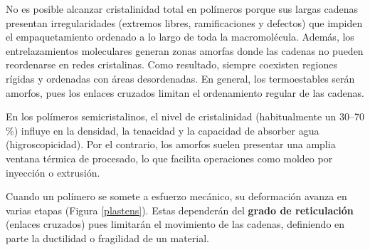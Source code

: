 No es posible alcanzar cristalinidad total en polímeros porque sus largas cadenas presentan irregularidades (extremos libres, ramificaciones y defectos) que impiden el empaquetamiento ordenado a lo largo de toda la macromolécula. Además, los entrelazamientos moleculares generan zonas amorfas donde las cadenas no pueden reordenarse en redes cristalinas. Como resultado, siempre coexisten regiones rígidas y ordenadas con áreas desordenadas. En general, los termoestables serán amorfos, pues los enlaces cruzados limitan el ordenamiento regular de las cadenas.

En los polímeros semicristalinos, el nivel de cristalinidad (habitualmente un 30–70$\%$) influye en la densidad, la tenacidad y la capacidad de absorber agua (higroscopicidad). Por el contrario, los amorfos suelen presentar una amplia ventana térmica de procesado, lo que facilita operaciones como moldeo por inyección o extrusión.

Cuando un polímero se somete a esfuerzo mecánico, su deformación avanza en varias etapas (Figura \ref{plastens}). Estas dependerán del \textbf{grado de reticulación} (enlaces cruzados) pues limitarán el movimiento de las cadenas, definiendo en parte la ductilidad o fragilidad de un material.

